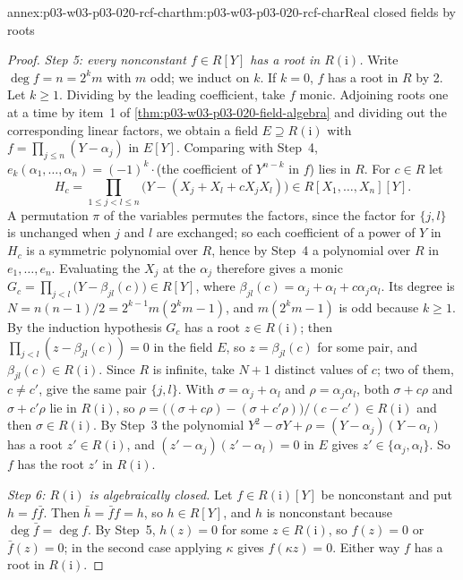 \begin{annexitem}{annex:p03-w03-p03-020-rcf-char}{thm:p03-w03-p03-020-rcf-char}{Real closed fields by roots}
\begin{proof}
\emph{Step 5: every nonconstant \(f\in R[Y]\) has a root in
\(R(\mathrm i)\).} Write \(\deg f=n=2^km\) with \(m\) odd; we induct on
\(k\). If \(k=0\), \(f\) has a root in \(R\) by 2. Let \(k\ge1\). Dividing by
the leading coefficient, take \(f\) monic. Adjoining roots one at a time by
item~1 of \cref{thm:p03-w03-p03-020-field-algebra} and dividing out the
corresponding linear factors, we obtain a field \(E\supseteq R(\mathrm i)\)
with \(f=\prod_{j\le n}(Y-\alpha_j)\) in \(E[Y]\). Comparing with Step~4,
\(e_k(\alpha_1,\ldots,\alpha_n)=(-1)^k\cdot\)(the coefficient of
\(Y^{n-k}\) in \(f\)) lies in \(R\). For \(c\in R\) let
\[
H_c=\prod_{1\le j<l\le n}\bigl(Y-(X_j+X_l+cX_jX_l)\bigr)\in
R[X_1,\ldots,X_n][Y].
\]
A permutation \(\pi\) of the variables permutes the factors, since the
factor for \(\{j,l\}\) is unchanged when \(j\) and \(l\) are exchanged; so
each coefficient of a power of \(Y\) in \(H_c\) is a symmetric polynomial
over \(R\), hence by Step~4 a polynomial over \(R\) in \(e_1,\ldots,e_n\).
Evaluating the \(X_j\) at the \(\alpha_j\) therefore gives a monic
\(G_c=\prod_{j<l}\bigl(Y-\beta_{jl}(c)\bigr)\in R[Y]\), where
\(\beta_{jl}(c)=\alpha_j+\alpha_l+c\alpha_j\alpha_l\). Its degree is
\(N=n(n-1)/2=2^{k-1}m(2^km-1)\), and \(m(2^km-1)\) is odd because
\(k\ge1\). By the induction hypothesis \(G_c\) has a root \(z\in
R(\mathrm i)\); then \(\prod_{j<l}(z-\beta_{jl}(c))=0\) in the field \(E\),
so \(z=\beta_{jl}(c)\) for some pair, and \(\beta_{jl}(c)\in R(\mathrm i)\).
Since \(R\) is infinite, take \(N+1\) distinct values of \(c\); two of
them, \(c\ne c'\), give the same pair \(\{j,l\}\). With
\(\sigma=\alpha_j+\alpha_l\) and \(\rho=\alpha_j\alpha_l\), both
\(\sigma+c\rho\) and \(\sigma+c'\rho\) lie in \(R(\mathrm i)\), so
\(\rho=\bigl((\sigma+c\rho)-(\sigma+c'\rho)\bigr)/(c-c')\in R(\mathrm i)\)
and then \(\sigma\in R(\mathrm i)\). By Step~3 the polynomial
\(Y^2-\sigma Y+\rho=(Y-\alpha_j)(Y-\alpha_l)\) has a root
\(z'\in R(\mathrm i)\), and \((z'-\alpha_j)(z'-\alpha_l)=0\) in \(E\) gives
\(z'\in\{\alpha_j,\alpha_l\}\). So \(f\) has the root \(z'\) in
\(R(\mathrm i)\).

\emph{Step 6: \(R(\mathrm i)\) is algebraically closed.} Let
\(f\in R(\mathrm i)[Y]\) be nonconstant and put \(h=f\bar f\). Then
\(\bar h=\bar ff=h\), so \(h\in R[Y]\), and \(h\) is nonconstant because
\(\deg\bar f=\deg f\). By Step~5, \(h(z)=0\) for some
\(z\in R(\mathrm i)\), so \(f(z)=0\) or \(\bar f(z)=0\); in the second case
applying \(\kappa\) gives \(f(\kappa z)=0\). Either way \(f\) has a root in
\(R(\mathrm i)\).


\end{proof}
\end{annexitem}
